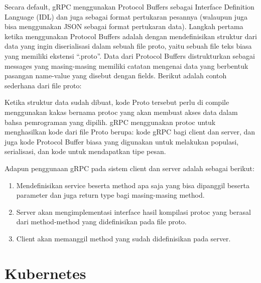 Secara default, gRPC menggunakan Protocol Buffers sebagai Interface Definition Language (IDL) dan juga sebagai format pertukaran pesannya (walaupun juga bisa menggunakan JSON sebagai format pertukaran data).
Langkah pertama ketika menggunakan Protocol Buffers adalah dengan mendefinisikan struktur dari data yang ingin diserialisasi dalam sebuah file proto, yaitu sebuah file teks biasa yang memiliki ekstensi “.proto”.
Data dari Protocol Buffers distrukturkan sebagai messages yang masing-masing memiliki catatan mengenai data yang berbentuk pasangan name-value yang disebut dengan fields.
Berikut adalah contoh sederhana dari file proto:
\pagebreak


Ketika struktur data sudah dibuat, kode Proto tersebut perlu di compile menggunakan kakas bernama protoc yang akan membuat akses data dalam bahsa pemrograman yang dipilih.
gRPC menggunakan protoc untuk menghasilkan kode dari file Proto berupa: kode gRPC bagi client dan server, dan juga kode Protocol Buffer biasa yang digunakan untuk melakukan populasi, serialisasi, dan kode untuk mendapatkan tipe pesan.

Adapun penggunaan gRPC pada sistem client dan server adalah sebagai berikut:
\begin{enumerate}
	\item Mendefinisikan service beserta method apa saja yang bisa dipanggil beserta parameter dan juga return type bagi masing-masing method.
	\item  Server akan mengimplementasi interface hasil kompilasi protoc yang berasal dari method-method yang didefinisikan pada file proto.
	\item Client akan memanggil method yang sudah didefinisikan pada server.
\end{enumerate}

\section{Kubernetes}

